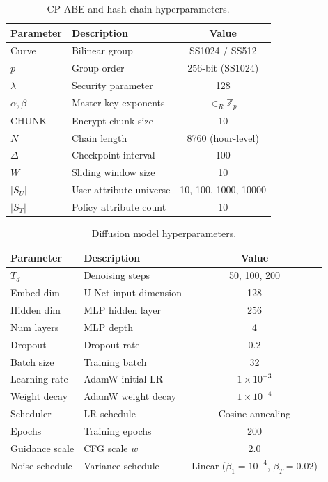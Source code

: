 \documentclass[lettersize,journal]{IEEEtran}
\begin{document}
\begin{table}[t]
\centering
\caption{CP-ABE and hash chain hyperparameters.}
\label{tab:repro_cpabe}
\begin{tabular}{llc}
\toprule
\textbf{Parameter} & \textbf{Description} & \textbf{Value} \\
\midrule
Curve & Bilinear group & SS1024 / SS512 \\
$p$ & Group order & 256-bit (SS1024) \\
$\lambda$ & Security parameter & 128 \\
$\alpha, \beta$ & Master key exponents & $\in_R \mathbb{Z}_p$ \\
CHUNK & Encrypt chunk size & 10 \\
$N$ & Chain length & 8760 (hour-level) \\
$\Delta$ & Checkpoint interval & 100 \\
$W$ & Sliding window size & 10 \\
$|S_U|$ & User attribute universe & 10, 100, 1000, 10000 \\
$|S_T|$ & Policy attribute count & 10 \\
\bottomrule
\end{tabular}
\end{table}

\begin{table}[t]
\centering
\caption{Diffusion model hyperparameters.}
\label{tab:repro_diffusion}
\begin{tabular}{llc}
\toprule
\textbf{Parameter} & \textbf{Description} & \textbf{Value} \\
\midrule
$T_d$ & Denoising steps & 50, 100, 200 \\
Embed dim & U-Net input dimension & 128 \\
Hidden dim & MLP hidden layer & 256 \\
Num layers & MLP depth & 4 \\
Dropout & Dropout rate & 0.2 \\
Batch size & Training batch & 32 \\
Learning rate & AdamW initial LR & $1\times10^{-3}$ \\
Weight decay & AdamW weight decay & $1\times10^{-4}$ \\
Scheduler & LR schedule & Cosine annealing \\
Epochs & Training epochs & 200 \\
Guidance scale & CFG scale $w$ & 2.0 \\
Noise schedule & Variance schedule & Linear ($\beta_1=10^{-4}$, $\beta_{T}=0.02$) \\
\bottomrule
\end{tabular}
\end{table}
\end{document}
